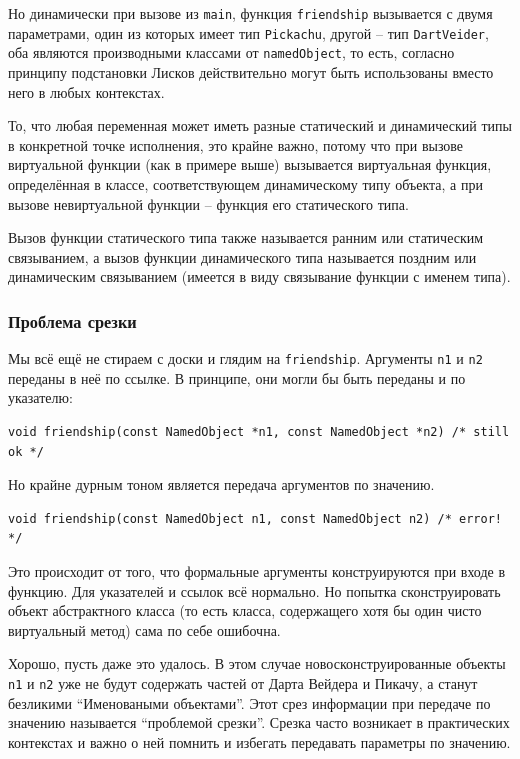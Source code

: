 \documentclass[a4paper,12pt,oneside]{article}
\begin{document}
Но динамически при вызове из \lstinline!main!, функция \lstinline!friendship! вызывается с двумя параметрами, один из которых имеет тип \lstinline!Pickachu!, другой – тип \lstinline!DartVeider!, оба являются производными классами от \lstinline!namedObject!, то есть, согласно принципу подстановки Лисков действительно могут быть использованы вместо него в любых контекстах.

То, что любая переменная может иметь разные статический и динамический типы в конкретной точке исполнения, это крайне важно, потому что при вызове виртуальной функции (как в примере выше) вызывается виртуальная функция, определённая в классе, соответствующем динамическому типу объекта, а при вызове невиртуальной функции – функция его статического типа.

Вызов функции статического типа также называется ранним или статическим связыванием, а вызов функции динамического типа называется поздним или динамическим связыванием (имеется в виду связывание функции с именем типа).

\subsubsection{Проблема срезки}

Мы всё ещё не стираем с доски и глядим на \lstinline!friendship!. Аргументы \lstinline!n1! и \lstinline!n2! переданы в неё по ссылке. В принципе, они могли бы быть переданы и по указателю:

\begin{lstlisting}
void friendship(const NamedObject *n1, const NamedObject *n2) /* still ok */
\end{lstlisting}

Но крайне дурным тоном является передача аргументов по значению.

\begin{lstlisting}
void friendship(const NamedObject n1, const NamedObject n2) /* error! */
\end{lstlisting}

Это происходит от того, что формальные аргументы конструируются при входе в функцию. Для указателей и ссылок всё нормально. Но попытка сконструировать объект абстрактного класса (то есть класса, содержащего хотя бы один чисто виртуальный метод) сама по себе ошибочна.

Хорошо, пусть даже это удалось. В этом случае новосконструированные объекты \lstinline!n1! и \lstinline!n2! уже не будут содержать частей от Дарта Вейдера и Пикачу, а станут безликими ``Именоваными объектами''. Этот срез информации при передаче по значению называется ``проблемой срезки''. Срезка часто возникает в практических контекстах и важно о ней помнить и избегать передавать параметры по значению.
\end{document}
